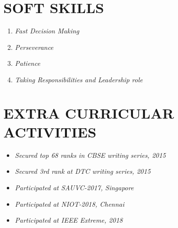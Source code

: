 \documentclass[margin]{res}
\begin{document}
\begin{enumerate}
\section{SOFT SKILLS }\begin{enumerate}
\item{\sl Fast Decision Making }
\item{\sl Perseverance}
\item{\sl Patience}
\item{\sl Taking Responsibilities and Leadership role}
\end{enumerate}

\section{EXTRA CURRICULAR ACTIVITIES}\begin{itemize}
\item{\sl Secured top 68 ranks in CBSE writing series, 2015}
\item{\sl Secured 3rd rank at DTC writing series, 2015}

\item{\sl Participated at SAUVC-2017, Singapore}

\item{\sl Participated at NIOT-2018, Chennai}
\item{\sl Participated at IEEE Extreme, 2018}
\end{itemize}




	\end{enumerate}
\end{document}
